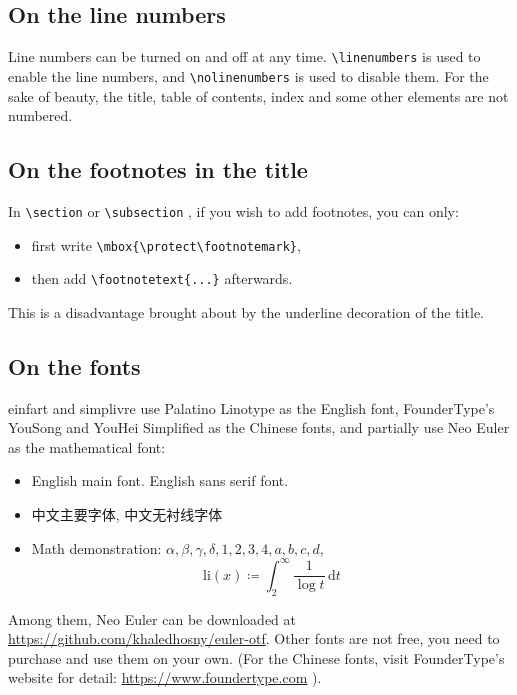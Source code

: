 \documentclass{einfart}
\providecommand{\einfart}{\textsf{einfart}}
\providecommand{\simplivre}{\textsf{simplivre}}
\begin{document}

\subsection{On the line numbers}
Line numbers can be turned on and off at any time. \lstinline|\linenumbers| is used to enable the line numbers, and \lstinline|\nolinenumbers| is used to disable them. For the sake of beauty, the title, table of contents, index and some other elements are not numbered.

\subsection{On the footnotes in the title}
In \lstinline|\section| or \lstinline|\subsection| , if you wish to add footnotes, you can only:
\begin{itemize}
    \item first write \lstinline|\mbox{\protect\footnotemark}|, 
    \item then add \lstinline|\footnotetext{...}| afterwards. 
\end{itemize}
This is a disadvantage brought about by the underline decoration of the title.

\subsection{On the fonts}
\einfart{} and \simplivre{} use Palatino Linotype as the English font, FounderType's YouSong and YouHei Simplified as the Chinese fonts, and partially use Neo Euler as the mathematical font:
\begin{itemize}
    \item English main font. \textsf{English sans serif font}.
    \item 中文主要字体, \textsf{中文无衬线字体}
    \item Math demonstration: \( \alpha, \beta, \gamma, \delta, 1,2,3,4, a,b,c,d \), \[\mathrm{li}(x)\coloneqq \int_2^{\infty} \frac{1}{\log t}\,\mathrm{d}t \]
\end{itemize}

Among them, Neo Euler can be downloaded at \url{https://github.com/khaledhosny/euler-otf}. Other fonts are not free, you need to purchase and use them on your own. (For the Chinese fonts, visit FounderType's website for detail: \url{https://www.foundertype.com} ).
\end{document}
